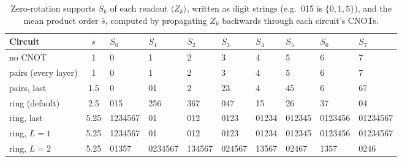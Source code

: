 \begin{table}[h]
\centering
\caption{Zero-rotation supports $S_k$ of each readout $\langle Z_k\rangle$, written as digit strings (e.g.\ 015 is $\{0,1,5\}$), and
the mean product order $\bar{s}$, computed by propagating $Z_k$ backwards through each
circuit's CNOTs.}
\label{tab:supports}
\small
\setlength{\tabcolsep}{4pt}
\begin{tabular}{lcllllllll}
\toprule
Circuit & $\bar{s}$ & $S_0$ & $S_1$ & $S_2$ & $S_3$ & $S_4$ & $S_5$ & $S_6$ & $S_7$ \\
\midrule
no CNOT & 1 & 0 & 1 & 2 & 3 & 4 & 5 & 6 & 7 \\
pairs (every layer) & 1 & 0 & 1 & 2 & 3 & 4 & 5 & 6 & 7 \\
pairs, last & 1.5 & 0 & 01 & 2 & 23 & 4 & 45 & 6 & 67 \\
ring (default) & 2.5 & 015 & 256 & 367 & 047 & 15 & 26 & 37 & 04 \\
ring, last & 5.25 & 1234567 & 01 & 012 & 0123 & 01234 & 012345 & 0123456 & 01234567 \\
ring, $L=1$ & 5.25 & 1234567 & 01 & 012 & 0123 & 01234 & 012345 & 0123456 & 01234567 \\
ring, $L=2$ & 5.25 & 01357 & 0234567 & 134567 & 024567 & 13567 & 02467 & 1357 & 0246 \\
\bottomrule
\end{tabular}
\end{table}
